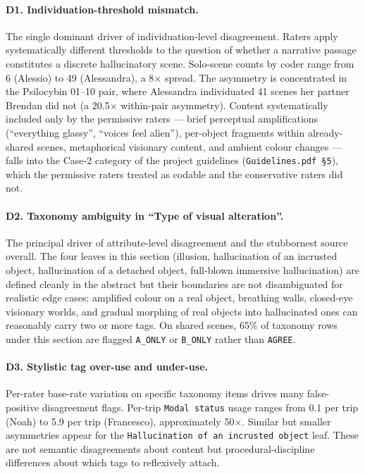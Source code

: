 \paragraph{D1. Individuation-threshold mismatch.}
The single dominant driver of individuation-level disagreement. Raters apply systematically different thresholds to the question of whether a narrative passage constitutes a discrete hallucinatory scene. Solo-scene counts by coder range from 6 (Alessio) to 49 (Alessandra), a 8$\times$ spread. The asymmetry is concentrated in the Psilocybin 01--10 pair, where Alessandra individuated 41 scenes her partner Brendan did not (a 20.5$\times$ within-pair asymmetry). Content systematically included only by the permissive raters --- brief perceptual amplifications (``everything glassy'', ``voices feel alien''), per-object fragments within already-shared scenes, metaphorical visionary content, and ambient colour changes --- falls into the Case-2 category of the project guidelines (\texttt{Guidelines.pdf \S5}), which the permissive raters treated as codable and the conservative raters did not.

\paragraph{D2. Taxonomy ambiguity in ``Type of visual alteration''.}
The principal driver of attribute-level disagreement and the stubbornest source overall. The four leaves in this section (illusion, hallucination of an incrusted object, hallucination of a detached object, full-blown immersive hallucination) are defined cleanly in the abstract but their boundaries are not disambiguated for realistic edge cases: amplified colour on a real object, breathing walls, closed-eye visionary worlds, and gradual morphing of real objects into hallucinated ones can reasonably carry two or more tags. On shared scenes, 65\% of taxonomy rows under this section are flagged \texttt{A\_ONLY} or \texttt{B\_ONLY} rather than \texttt{AGREE}.

\paragraph{D3. Stylistic tag over-use and under-use.}
Per-rater base-rate variation on specific taxonomy items drives many false-positive disagreement flags. Per-trip \texttt{Modal status} usage ranges from 0.1 per trip (Noah) to 5.9 per trip (Francesco), approximately 50$\times$. Similar but smaller asymmetries appear for the \texttt{Hallucination of an incrusted object} leaf. These are not semantic disagreements about content but procedural-discipline differences about which tags to reflexively attach.

